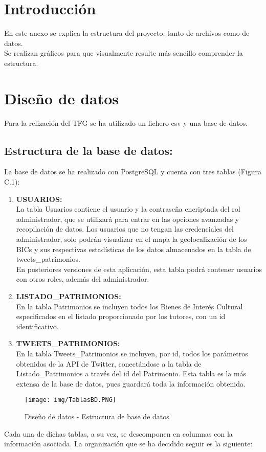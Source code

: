 
\section{Introducción}
En este anexo se explica la estructura del proyecto, tanto de archivos como de datos.\\
Se realizan gráficos para que visualmente resulte más sencillo comprender la estructura.
\section{Diseño de datos}
Para la relización del TFG se ha utilizado un fichero csv y una base de datos.
\subsection{Estructura de la base de datos:}
La base de datos se ha realizado con PostgreSQL y cuenta con tres tablas (Figura C.1):
\begin{enumerate}
    \item \textbf{USUARIOS:}\\
    La tabla Usuarios contiene el usuario y la contraseña encriptada del rol administrador, que se utilizará para entrar en las opciones avanzadas y recopilación de datos.
    Los usuarios que no tengan las credenciales del administrador, solo podrán visualizar en el mapa la geolocalización de los BICs y sus respectivas estadísticas de los datos almacenados en la tabla de tweets\_patrimonios.\\
    En posteriores versiones de esta aplicación, esta tabla podrá contener usuarios con otros roles, además del administrador.
    \item \textbf{LISTADO\_PATRIMONIOS:}\\
    En la tabla Patrimonios se incluyen todos los Bienes de Interés Cultural especificados en el listado proporcionado por los tutores, con un id identificativo.
    \item \textbf{TWEETS\_PATRIMONIOS:}\\
    En la tabla Tweets\_Patrimonios se incluyen, por id, todos los parámetros obtenidos de la API de Twitter, conectándose a la tabla de Listado\_Patrimonios a través del id del Patrimonio. Esta tabla es la más extensa de la base de datos, pues guardará toda la información obtenida.
\end{enumerate}
\begin{figure}[h]
    \centering
    \texttt{[image: img/TablasBD.PNG]} 
    \caption{Diseño de datos - Estructura de base de datos}
     \label{Diseño de datos - Estructura de base de datos}
\end{figure}
Cada una de dichas tablas, a su vez, se descomponen en columnas con la información asociada. La organización que se ha decidido seguir es la siguiente:


